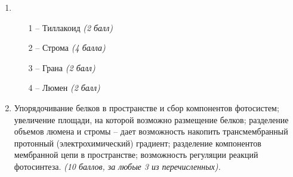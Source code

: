 \solutionSection
\begin{enumerate}
    \item
    \begin{enumerate}
    \item [1 –] Тиллакоид \textit{(2 балл)}
    \item [2 –] Строма \textit{(4 балла)}
    \item [3 –] Грана \textit{(2 балл)}
    \item [4 –] Люмен \textit{(2 балл)}
    \end{enumerate}
    \item Упорядочивание белков в пространстве и сбор компонентов фотосистем; увеличение площади, на которой возможно размещение белков;  разделение объемов люмена и стромы – дает возможность накопить трансмембранный протонный (электрохимический) градиент; разделение  компонентов мембранной цепи в пространстве;  возможность регуляции реакций фотосинтеза. \textit{(10 баллов, за любые 3 из перечисленных).}
\end{enumerate}